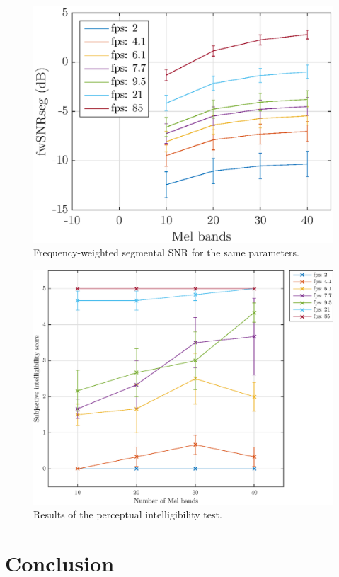 \documentclass[final,3p,times,twocolumn]{elsarticle}
\begin{document}
\begin{figure}[htbp]
	\centering
		\includegraphics[width=\columnwidth]{figures/fwsnrseg_mel_avg.eps}
	\caption{Frequency-weighted segmental SNR for the same parameters.}
	\label{fig:fwsnrseg_mel_avg}
\end{figure}

\begin{figure}[htbp]
	\centering
		\includegraphics[width=\columnwidth]{figures/percint_mel_avg.eps}
	\caption{Results of the perceptual intelligibility test.}
	\label{fig:percint_mel_avg}
\end{figure}
\section{Conclusion}
\end{document}
